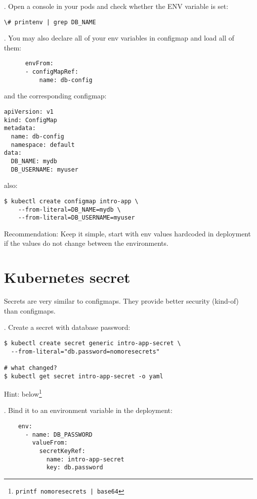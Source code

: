 \documentclass[12pt, letterpaper]{article}
\begin{document}
. Open a console in your pods and check whether the ENV variable is set:

\begin{verbatim}
\# printenv | grep DB_NAME
\end{verbatim}

. You may also declare all of your env variables in configmap and load all of them:

\begin{verbatim}
      envFrom:
      - configMapRef:
          name: db-config
\end{verbatim}

and the corresponding configmap:

\begin{verbatim}
apiVersion: v1
kind: ConfigMap
metadata:
  name: db-config
  namespace: default
data:
  DB_NAME: mydb
  DB_USERNAME: myuser
\end{verbatim}

also:

\begin{verbatim}
$ kubectl create configmap intro-app \
    --from-literal=DB_NAME=mydb \
    --from-literal=DB_USERNAME=myuser
\end{verbatim}

\bigskip
Recommendation: Keep it simple, start with env values hardcoded in deployment if the values do not change between the environments.

\section{Kubernetes secret}

Secrets are very similar to configmaps. They provide better security (kind-of) than configmaps.

. Create a secret with database password:

\begin{verbatim}
$ kubectl create secret generic intro-app-secret \
  --from-literal="db.password=nomoresecrets"

# what changed?
$ kubectl get secret intro-app-secret -o yaml
\end{verbatim}

Hint: below\footnote{\texttt{printf nomoresecrets | base64}}

\bigskip
2. Bind it to an environment variable in the deployment:

\begin{verbatim}
    env:
      - name: DB_PASSWORD
        valueFrom:
          secretKeyRef:
            name: intro-app-secret
            key: db.password

\end{verbatim}
\end{document}
